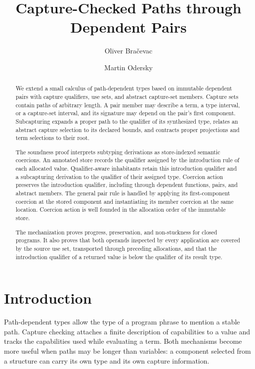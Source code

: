 \documentclass[acmsmall,screen,nonacm]{acmart}
\title{Capture-Checked Paths through Dependent Pairs}
\author{Oliver Bra\v{c}evac}
\author{Martin Odersky}
\begin{document}
\begin{abstract}
We extend a small calculus of path-dependent types based on immutable
dependent pairs with capture qualifiers, use sets, and abstract capture-set
members. Capture sets contain paths of arbitrary length. A pair member may
describe a term, a type interval, or a capture-set interval, and its signature
may depend on the pair's first component. Subcapturing expands a proper path
to the qualifier of its synthesized type, relates an abstract capture
selection to its declared bounds, and contracts proper projections and term
selections to their root.

The soundness proof interprets subtyping derivations as store-indexed
semantic coercions.  An annotated store records the qualifier assigned by
the introduction rule of each allocated value.  Qualifier-aware inhabitants
retain this introduction qualifier and a subcapturing derivation to the
qualifier of their assigned type.  Coercion action preserves the introduction
qualifier, including through dependent functions, pairs, and abstract
members.  The general pair rule is handled by applying its first-component
coercion at the stored component and instantiating its member coercion at the
same location.  Coercion action is well founded in the allocation order of
the immutable store.

The mechanization proves progress, preservation, and non-stuckness for
closed programs.  It also proves that both operands inspected by every
application are covered by the source use set, transported through preceding
allocations, and that the introduction qualifier of a returned value is
below the qualifier of its result type.
\end{abstract}


\maketitle

\section{Introduction}

Path-dependent types allow the type of a program phrase to mention a stable
path. Capture checking attaches a finite description of capabilities to a
value and tracks the capabilities used while evaluating a term. Both
mechanisms become more useful when paths may be longer than variables: a
component selected from a structure can carry its own type and its own
capture information.
\end{document}
